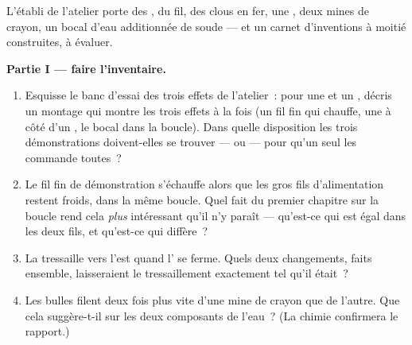 \begin{problem}\label{pb:g8:electric-current-effects:1}
L'établi de l'atelier porte des , du fil, des clous en fer, une
, deux mines de crayon, un bocal d'eau additionnée de
soude --- et un carnet d'inventions à moitié construites, à
évaluer.

\medskip\noindent\textbf{Partie I --- faire l'inventaire.}
\begin{enumerate}
  \item Esquisse le banc d'essai des trois effets de l'atelier~:
        pour une  et un , décris un montage qui
        montre les trois effets à la fois (un fil fin qui chauffe,
        une  à côté d'un , le bocal dans la
        boucle). Dans quelle disposition les trois démonstrations
        doivent-elles se trouver ---  ou  ---
        pour qu'un seul  les commande toutes~?
  \item Le fil fin de démonstration s'échauffe alors que les gros
        fils d'alimentation restent froids, dans la même boucle.
        Quel fait du premier chapitre sur la boucle  rend
        cela \emph{plus} intéressant qu'il n'y paraît --- qu'est-ce
        qui est égal dans les deux fils, et qu'est-ce qui diffère~?
  \item La  tressaille vers l'est quand l' se
        ferme. Quels deux changements, faits ensemble, laisseraient
        le tressaillement exactement tel qu'il était~?
  \item Les bulles filent deux fois plus vite d'une mine de crayon
        que de l'autre. Que cela suggère-t-il sur les deux
        composants de l'eau~? (La chimie confirmera le rapport.)
\end{enumerate}


\end{problem}
